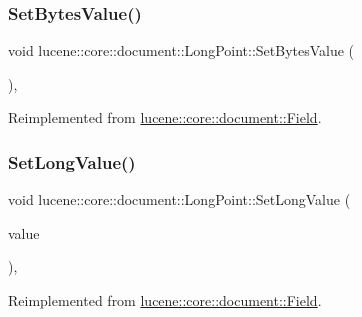 \subsubsection{\texorpdfstring{Set\+Bytes\+Value()}{SetBytesValue()}}
{\footnotesize\ttfamily void lucene\+::core\+::document\+::\+Long\+Point\+::\+Set\+Bytes\+Value (\begin{DoxyParamCaption}\item[{const \mbox{\hyperlink{classlucene_1_1core_1_1util_1_1BytesRef}{lucene\+::core\+::util\+::\+Bytes\+Ref}} \&}]{ }\end{DoxyParamCaption})\hspace{0.3cm}{\ttfamily [inline]}, {\ttfamily [virtual]}}



Reimplemented from \mbox{\hyperlink{classlucene_1_1core_1_1document_1_1Field_a41d077e63ce6fae8677b8df6b29821bd}{lucene\+::core\+::document\+::\+Field}}.

\mbox{\label{classlucene_1_1core_1_1document_1_1LongPoint_a5bc668dfdf190b8bc0a52808a6580b40}} 
\subsubsection{\texorpdfstring{Set\+Long\+Value()}{SetLongValue()}}
{\footnotesize\ttfamily void lucene\+::core\+::document\+::\+Long\+Point\+::\+Set\+Long\+Value (\begin{DoxyParamCaption}\item[{const int64\+\_\+t}]{value }\end{DoxyParamCaption})\hspace{0.3cm}{\ttfamily [inline]}, {\ttfamily [virtual]}}



Reimplemented from \mbox{\hyperlink{classlucene_1_1core_1_1document_1_1Field_a949822599f392fb7fca20423902e535a}{lucene\+::core\+::document\+::\+Field}}.

\mbox{\label{classlucene_1_1core_1_1document_1_1LongPoint_a8561762cd09cae0222620709406e3ba2}} 

